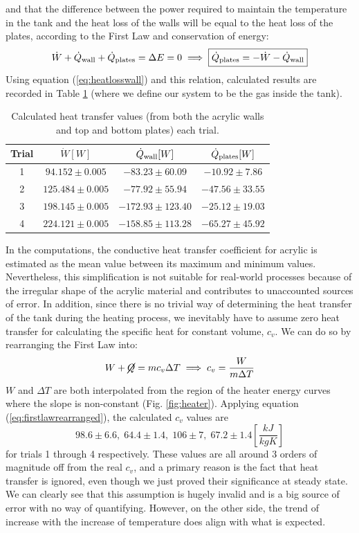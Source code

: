 \documentclass[12pt]{article}
\begin{document}
and that the difference between the power required to maintain the temperature in the tank and the heat loss of the walls will be equal to the heat loss of the plates, according to the First Law and conservation of energy:
\begin{equation}
    \dot{W}+\dot{Q}_{\rm wall}+\dot{Q}_{\rm plates}=\Delta E = 0\implies\boxed{\dot{Q}_{\rm plates}=-\dot{W}-\dot{Q}_{\rm wall}}
    \label{eq:heatloss}
\end{equation}
Using equation (\ref{eq:heatlosswall}) and this relation, calculated results are recorded in Table \ref{table:heatloss} (where we define our system to be the gas inside the tank).
\begin{table}[h]
  \centering
  \begin{tabular}{|c|c|c|c|}
    \hline
    Trial & $\dot{W}[W]$ & $\dot{Q}_{\rm wall}[W]$ & $\dot{Q}_{\rm plates}[W]$ \\
    \hline
    1 & $94.152\pm0.005$&$ -83.23\pm60.09$&$ -10.92\pm7.86$\\
    2 & $125.484\pm0.005$&$ -77.92\pm55.94$&$ -47.56\pm33.55$\\
    3 & $198.145\pm0.005$&$ -172.93\pm123.40$&$ -25.12\pm19.03$\\
    4 & $224.121\pm0.005$&$ -158.85\pm113.28$&$ -65.27\pm45.92$\\
    \hline
  \end{tabular}
  \caption{Calculated heat transfer values (from both the acrylic walls and top and bottom plates) each trial.}
  \label{table:heatloss}
\end{table}
In the computations, the conductive heat transfer coefficient for acrylic is estimated as the mean value between its maximum and minimum values. Nevertheless, this simplification is not suitable for real-world processes because of the irregular shape of the acrylic material and contributes to unaccounted sources of error. In addition, since there is no trivial way of determining the heat transfer of the tank during the heating process, we inevitably have to assume zero heat transfer for calculating the specific heat for constant volume, $c_v$. We can do so by rearranging the First Law into:
\begin{equation}
    W+\cancel{Q}=mc_v\Delta T\implies c_v=\frac{W}{m\Delta T}
    \label{eq:firstlawrearranged}
\end{equation}
$W$ and $\Delta T$ are both interpolated from the region of the heater energy curves where the slope is non-constant (Fig. \ref{fig:heater}). Applying equation (\ref{eq:firstlawrearranged}), the calculated $c_v$ values are $$98.6\pm6.6,\;64.4\pm1.4,\;106\pm7,\;67.2\pm1.4\left[\frac{kJ}{kgK}\right]$$ for trials 1 through 4 respectively. These values are all around 3 orders of magnitude off from the real $c_v$, and a primary reason is the fact that heat transfer is ignored, even though we just proved their significance at steady state. We can clearly see that this assumption is hugely invalid and is a big source of error with no way of quantifying. However, on the other side, the trend of increase with the increase of temperature does align with what is expected.
\end{document}
